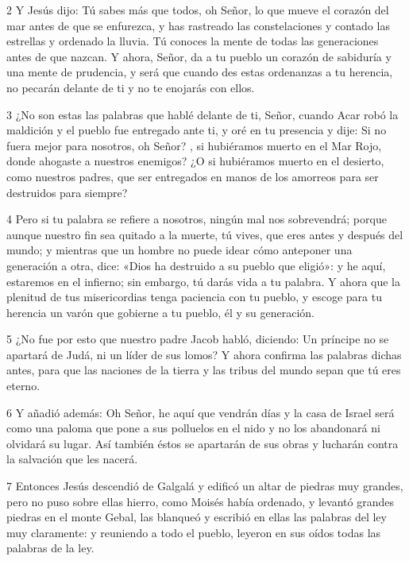\par 2 Y Jesús dijo: Tú sabes más que todos, oh Señor, lo que mueve el corazón del mar antes de que se enfurezca, y has rastreado las constelaciones y contado las estrellas y ordenado la lluvia. Tú conoces la mente de todas las generaciones antes de que nazcan. Y ahora, Señor, da a tu pueblo un corazón de sabiduría y una mente de prudencia, y será que cuando des estas ordenanzas a tu herencia, no pecarán delante de ti y no te enojarás con ellos.

\par 3 ¿No son estas las palabras que hablé delante de ti, Señor, cuando Acar robó la maldición y el pueblo fue entregado ante ti, y oré en tu presencia y dije: Si no fuera mejor para nosotros, oh Señor? , si hubiéramos muerto en el Mar Rojo, donde ahogaste a nuestros enemigos? ¿O si hubiéramos muerto en el desierto, como nuestros padres, que ser entregados en manos de los amorreos para ser destruidos para siempre?

\par 4 Pero si tu palabra se refiere a nosotros, ningún mal nos sobrevendrá; porque aunque nuestro fin sea quitado a la muerte, tú vives, que eres antes y después del mundo; y mientras que un hombre no puede idear cómo anteponer una generación a otra, dice: «Dios ha destruido a su pueblo que eligió»: y he aquí, estaremos en el infierno; sin embargo, tú darás vida a tu palabra. Y ahora que la plenitud de tus misericordias tenga paciencia con tu pueblo, y escoge para tu herencia un varón que gobierne a tu pueblo, él y su generación.

\par 5 ¿No fue por esto que nuestro padre Jacob habló, diciendo: Un príncipe no se apartará de Judá, ni un líder de sus lomos? Y ahora confirma las palabras dichas antes, para que las naciones de la tierra y las tribus del mundo sepan que tú eres eterno.

\par 6 Y añadió además: Oh Señor, he aquí que vendrán días y la casa de Israel será como una paloma que pone a sus polluelos en el nido y no los abandonará ni olvidará su lugar. Así también éstos se apartarán de sus obras y lucharán contra la salvación que les nacerá.

\par 7 Entonces Jesús descendió de Galgalá y edificó un altar de piedras muy grandes, pero no puso sobre ellas hierro, como Moisés había ordenado, y levantó grandes piedras en el monte Gebal, las blanqueó y escribió en ellas las palabras del ley muy claramente: y reuniendo a todo el pueblo, leyeron en sus oídos todas las palabras de la ley.

